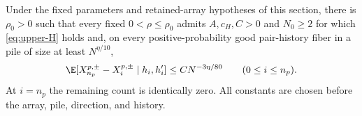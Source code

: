 \begin{proposition}\label{prop:upper-conditional}
Under the fixed parameters and retained-array hypotheses of this
section, there is $\rho_0>0$ such that every fixed
$0<\rho\le\rho_0$ admits $A,c_H,C>0$ and $N_0\ge2$ for which
\eqref{eq:upper-H} holds and, on every positive-probability good
pair-history fiber in a pile of size at least $N^{\eta/10}$,
\begin{equation}\label{eq:upper-conditional}
 \E[X_{n_p}^{p,\pm}-X_i^{p,\pm}\mid h_i,h'_i]
                          \le CN^{-3\eta/80}
                         \qquad(0\le i\le n_p).
\end{equation}
At $i=n_p$ the remaining count is identically zero. All constants
are chosen before the array, pile, direction, and history.
\end{proposition}
